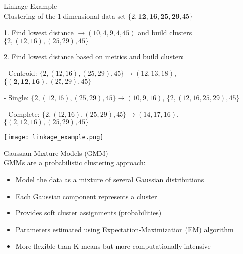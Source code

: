 \begin{example2}{Linkage Example}\\
    Clustering of the 1-dimensional data set $\{2, \mathbf{1 2}, \mathbf{1 6}, \mathbf{2 5}, \mathbf{2 9}, 45\}$

    1. Find lowest distance $\rightarrow(10,4,9,4,45)$ and build clusters
$
\{2,(12,16),(25,29), 45\}
$

2. Find lowest distance based on metrics and build clusters

- Centroid:
$
\{2,(12,16),(25,29), 45\} \rightarrow(12,13,18)
$, 
$
\{(\mathbf{2}, \mathbf{1 2}, \mathbf{1 6}),(25,29), 45\}
$

- Single:
$
\{2,(12,16),(25,29), 45\} \rightarrow(10,9,16)
$, 
$
\{2,(12,16,25,29), 45\}
$

- Complete:
$
\{2,(12,16),(25,29), 45\} \rightarrow(14,17,16)$, $
\{(2,12,16),(25,29), 45\}
$

\texttt{[image: linkage\_example.png]}
\end{example2}


\begin{concept}{Gaussian Mixture Models (GMM)}\\
GMMs are a probabilistic clustering approach:
\begin{itemize}
    \item Model the data as a mixture of several Gaussian distributions
    \item Each Gaussian component represents a cluster
    \item Provides soft cluster assignments (probabilities)
    \item Parameters estimated using Expectation-Maximization (EM) algorithm
    \item More flexible than K-means but more computationally intensive
\end{itemize}
\end{concept}

